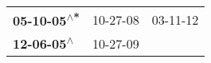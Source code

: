 \begin{supertabular}{lll}
 \textbf{05-10-05\textsuperscript{$\wedge$*}} &  10-27-08\textsuperscript{} &  03-11-12\textsuperscript{} \\
  \textbf{12-06-05\textsuperscript{$\wedge$}} &  10-27-09\textsuperscript{} &                             \\
\end{supertabular}
